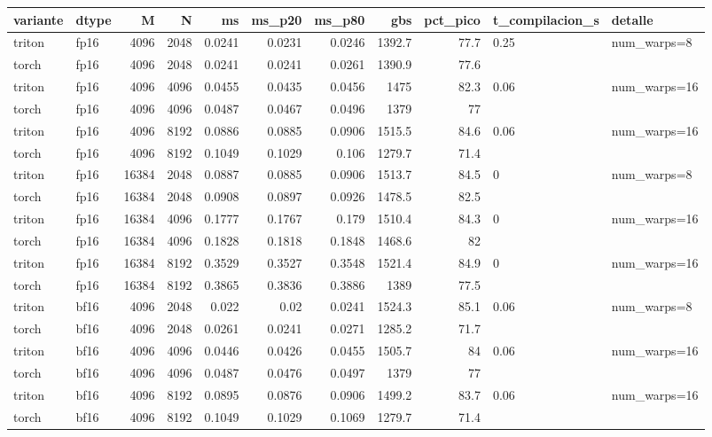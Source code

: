 \begin{table}[htbp]
  \centering\small
  \begin{tabular}{llrrrrrrrll}
    \toprule
    variante & dtype & M & N & ms & ms\_p20 & ms\_p80 & gbs & pct\_pico & t\_compilacion\_s & detalle \\
    \midrule
    triton & fp16 & 4096 & 2048 & 0.0241 & 0.0231 & 0.0246 & 1392.7 & 77.7 & 0.25 & num\_warps=8 \\
    torch & fp16 & 4096 & 2048 & 0.0241 & 0.0241 & 0.0261 & 1390.9 & 77.6 &  &  \\
    triton & fp16 & 4096 & 4096 & 0.0455 & 0.0435 & 0.0456 & 1475 & 82.3 & 0.06 & num\_warps=16 \\
    torch & fp16 & 4096 & 4096 & 0.0487 & 0.0467 & 0.0496 & 1379 & 77 &  &  \\
    triton & fp16 & 4096 & 8192 & 0.0886 & 0.0885 & 0.0906 & 1515.5 & 84.6 & 0.06 & num\_warps=16 \\
    torch & fp16 & 4096 & 8192 & 0.1049 & 0.1029 & 0.106 & 1279.7 & 71.4 &  &  \\
    triton & fp16 & 16384 & 2048 & 0.0887 & 0.0885 & 0.0906 & 1513.7 & 84.5 & 0 & num\_warps=8 \\
    torch & fp16 & 16384 & 2048 & 0.0908 & 0.0897 & 0.0926 & 1478.5 & 82.5 &  &  \\
    triton & fp16 & 16384 & 4096 & 0.1777 & 0.1767 & 0.179 & 1510.4 & 84.3 & 0 & num\_warps=16 \\
    torch & fp16 & 16384 & 4096 & 0.1828 & 0.1818 & 0.1848 & 1468.6 & 82 &  &  \\
    triton & fp16 & 16384 & 8192 & 0.3529 & 0.3527 & 0.3548 & 1521.4 & 84.9 & 0 & num\_warps=16 \\
    torch & fp16 & 16384 & 8192 & 0.3865 & 0.3836 & 0.3886 & 1389 & 77.5 &  &  \\
    triton & bf16 & 4096 & 2048 & 0.022 & 0.02 & 0.0241 & 1524.3 & 85.1 & 0.06 & num\_warps=8 \\
    torch & bf16 & 4096 & 2048 & 0.0261 & 0.0241 & 0.0271 & 1285.2 & 71.7 &  &  \\
    triton & bf16 & 4096 & 4096 & 0.0446 & 0.0426 & 0.0455 & 1505.7 & 84 & 0.06 & num\_warps=16 \\
    torch & bf16 & 4096 & 4096 & 0.0487 & 0.0476 & 0.0497 & 1379 & 77 &  &  \\
    triton & bf16 & 4096 & 8192 & 0.0895 & 0.0876 & 0.0906 & 1499.2 & 83.7 & 0.06 & num\_warps=16 \\
    torch & bf16 & 4096 & 8192 & 0.1049 & 0.1029 & 0.1069 & 1279.7 & 71.4 &  &  \\

\end{tabular}
\end{table}

